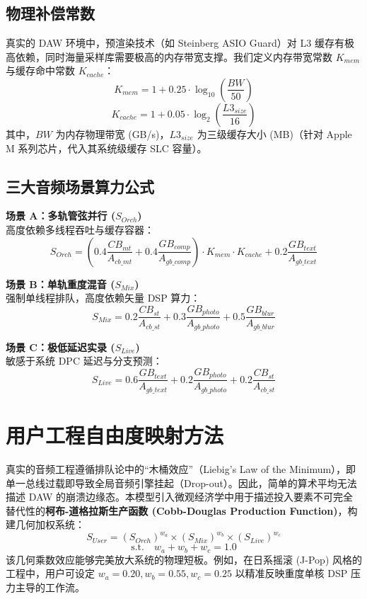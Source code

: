 \documentclass[11pt, a4paper]{article}
\begin{document}
\subsection{物理补偿常数}
真实的 DAW 环境中，预渲染技术（如 Steinberg ASIO Guard）对 L3 缓存有极高依赖，同时海量采样库需要极高的内存带宽支撑\cite{steinberg2023asioguard}。我们定义内存带宽常数 $K_{mem}$ 与缓存命中常数 $K_{cache}$：
$$K_{mem} = 1 + 0.25 \cdot \log_{10} \left( \frac{BW}{50} \right)$$
$$K_{cache} = 1 + 0.05 \cdot \log_{2} \left( \frac{L3_{size}}{16} \right)$$
其中，$BW$ 为内存物理带宽 (GB/s)，$L3_{size}$ 为三级缓存大小 (MB)（针对 Apple M 系列芯片，代入其系统级缓存 SLC 容量）。

\subsection{三大音频场景算力公式}
\textbf{场景 A：多轨管弦并行 ($S_{Orch}$)} \\
高度依赖多线程吞吐与缓存容器：
$$S_{Orch} = \left( 0.4 \frac{CB_{mt}}{A_{cb\_mt}} + 0.4 \frac{GB_{comp}}{A_{gb\_comp}} \right) \cdot K_{mem} \cdot K_{cache} + 0.2 \frac{GB_{text}}{A_{gb\_text}}$$

\textbf{场景 B：单轨重度混音 ($S_{Mix}$)} \\
强制单线程排队，高度依赖矢量 DSP 算力：
$$S_{Mix} = 0.2 \frac{CB_{st}}{A_{cb\_st}} + 0.3 \frac{GB_{photo}}{A_{gb\_photo}} + 0.5 \frac{GB_{blur}}{A_{gb\_blur}}$$

\textbf{场景 C：极低延迟实录 ($S_{Live}$)} \\
敏感于系统 DPC 延迟与分支预测：
$$S_{Live} = 0.6 \frac{GB_{text}}{A_{gb\_text}} + 0.2 \frac{GB_{photo}}{A_{gb\_photo}} + 0.2 \frac{CB_{st}}{A_{cb\_st}}$$

\section{用户工程自由度映射方法}
真实的音频工程遵循排队论中的“木桶效应”（Liebig's Law of the Minimum），即单一总线过载即导致全局音频引擎挂起（Drop-out）。因此，简单的算术平均无法描述 DAW 的崩溃边缘态。本模型引入微观经济学中用于描述投入要素不可完全替代性的\textbf{柯布-道格拉斯生产函数 (Cobb-Douglas Production Function)}\cite{cobb1928theory}，构建几何加权系统：
$$S_{User} = (S_{Orch})^{w_a} \times (S_{Mix})^{w_b} \times (S_{Live})^{w_c}$$
$$\text{s.t.} \quad w_a + w_b + w_c = 1.0$$
该几何乘数效应能够完美放大系统的物理短板。例如，在日系摇滚 (J-Pop) 风格的工程中，用户可设定 $w_a=0.20, w_b=0.55, w_c=0.25$ 以精准反映重度单核 DSP 压力主导的工作流。
\end{document}
